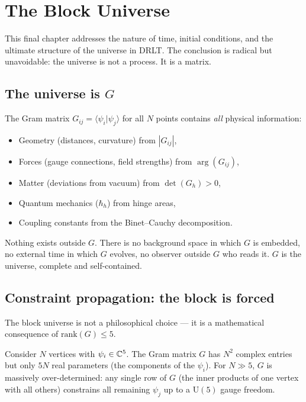 \section{The Block Universe}
\label{ch:block}

This final chapter addresses the nature of time, initial conditions, and the ultimate structure of the universe in DRLT. The conclusion is radical but unavoidable: the universe is not a process. It is a matrix.

\subsection{The universe is $G$}

The Gram matrix $G_{ij} = \langle\psi_i|\psi_j\rangle$ for all $N$ points contains \emph{all} physical information:
\begin{itemize}
\item Geometry (distances, curvature) from $|G_{ij}|$,
\item Forces (gauge connections, field strengths) from $\arg(G_{ij})$,
\item Matter (deviations from vacuum) from $\det(G_h) > 0$,
\item Quantum mechanics ($\hbar_h$) from hinge areas,
\item Coupling constants from the Binet--Cauchy decomposition.
\end{itemize}

Nothing exists outside $G$. There is no background space in which $G$ is embedded, no external time in which $G$ evolves, no observer outside $G$ who reads it. $G$ is the universe, complete and self-contained.

\subsection{Constraint propagation: the block is forced}

The block universe is not a philosophical choice --- it is a mathematical consequence of $\text{rank}(G) \leq 5$.

Consider $N$ vertices with $\psi_i \in \mathbb{C}^5$. The Gram matrix $G$ has $N^2$ complex entries but only $5N$ real parameters (the components of the $\psi_i$). For $N \gg 5$, $G$ is massively over-determined: any single row of $G$ (the inner products of one vertex with all others) constrains all remaining $\psi_j$ up to a $\text{U}(5)$ gauge freedom.


